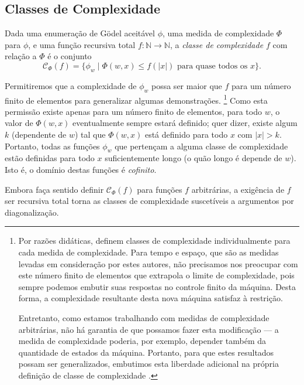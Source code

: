 \subsection{Classes de Complexidade}

\begin{definition}\cite[p.~242]{Kozen2006}
    Dada uma enumeração de Gödel aceitável $\phi$,
    uma medida de complexidade $\Phi$ para $\phi$,
    e uma função recursiva total
    $f: \mathbb N \rightarrow \mathbb N$,
    a \emph{classe de complexidade $f$} com relação a $\Phi$
    é o conjunto
    \begin{equation*}
        \mathcal C_\Phi(f) = \{ \phi_w \mid \Phi(w, x) \leq f(|x|)
            \text{ para quase todos os $x$}
        \}.
    \end{equation*}
\end{definition}
Permitiremos que a complexidade de $\phi_w$
possa ser maior que $f$ para um número finito de elementos
para generalizar algumas demonstrações.%
\footnote{
    Por razões didáticas, 
    definem classes de complexidade individualmente para cada medida de complexidade.
    Para tempo e espaço,
    que são as medidas levadas em consideração por estes autores,
    não precisamos nos preocupar com este número finito de elementos
    que extrapola o limite de complexidade,
    pois sempre podemos embutir suas respostas no controle finito da máquina.
    Desta forma,
    a complexidade resultante desta nova máquina satisfaz à restrição.

    Entretanto, como estamos trabalhando com medidas de complexidade arbitrárias,
    não há garantia de que possamos fazer esta modificação
    --- a medida de complexidade poderia, por exemplo,
    depender também da quantidade de estados da máquina.
    Portanto, para que estes resultados possam ser generalizados,
    embutimos esta liberdade adicional
    na própria definição de classe de complexidade
    \cite[p.~80]{McCreightMeyer1969}.
}
Como esta permissão existe apenas para um número finito de elementos,
para todo $w$, o valor de $\Phi(w, x)$ eventualmente sempre estará definido;
quer dizer, existe algum $k$ (dependente de $w$)
tal que $\Phi(w, x)$ está definido para todo $x$ com $|x| > k$.
Portanto,
todas as funções $\phi_w$ que pertençam a alguma classe de complexidade
estão definidas para todo $x$ suficientemente longo
(o quão longo é depende de $w$).
Isto é, o domínio destas funções é \emph{cofinito}.

Embora faça sentido definir $\mathcal C_\Phi(f)$
para funções $f$ arbitrárias,
a exigência de $f$ ser recursiva total
torna as classes de complexidade
suscetíveis a argumentos por diagonalização.

